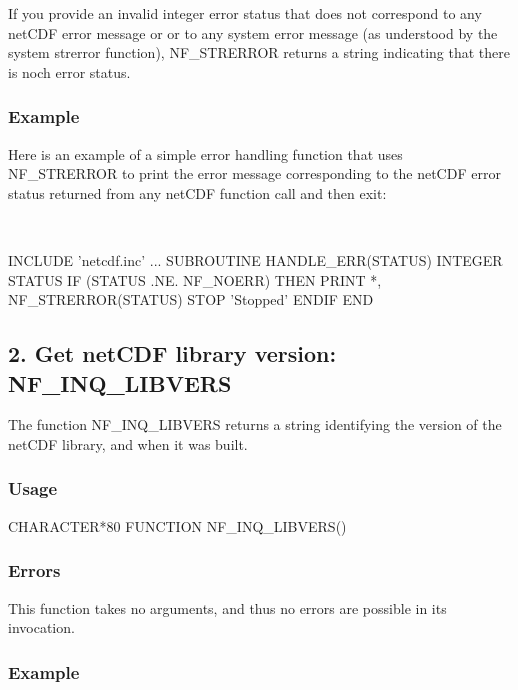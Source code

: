 If you provide an invalid integer error status that does not correspond to any net\+C\+DF error message or or to any system error message (as understood by the system strerror function), N\+F\+\_\+\+S\+T\+R\+E\+R\+R\+OR returns a string indicating that there is noch error status.

\subsubsection*{Example}

Here is an example of a simple error handling function that uses N\+F\+\_\+\+S\+T\+R\+E\+R\+R\+OR to print the error message corresponding to the net\+C\+DF error status returned from any net\+C\+DF function call and then exit\+:

 


\begin{DoxyCode}
INCLUDE 'netcdf.inc'
   ...
SUBROUTINE HANDLE\_ERR(STATUS)
INTEGER STATUS
IF (STATUS .NE. NF\_NOERR) THEN
  PRINT *, NF\_STRERROR(STATUS)
  STOP 'Stopped'
ENDIF
END
\end{DoxyCode}
\hypertarget{nc_f77_interface_guide_f77_Get_netCDF_library_version_NF_INQ_LIBVERS}{}\subsection{2. Get net\+C\+D\+F library version\+: N\+F\+\_\+\+I\+N\+Q\+\_\+\+L\+I\+B\+V\+E\+R\+S }\label{nc_f77_interface_guide_f77_Get_netCDF_library_version_NF_INQ_LIBVERS}
The function N\+F\+\_\+\+I\+N\+Q\+\_\+\+L\+I\+B\+V\+E\+RS returns a string identifying the version of the net\+C\+DF library, and when it was built.

\subsubsection*{Usage}


\begin{DoxyCode}
CHARACTER*80 FUNCTION NF\_INQ\_LIBVERS()
\end{DoxyCode}


\subsubsection*{Errors}

This function takes no arguments, and thus no errors are possible in its invocation.

\subsubsection*{Example}


